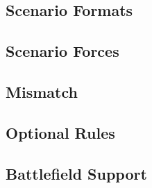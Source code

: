 

\subsection{Scenario Formats}



\subsection{Scenario Forces}



\newpage

\subsection{Mismatch}



\newpage

\subsection{Optional Rules}



\subsection{Battlefield Support}



